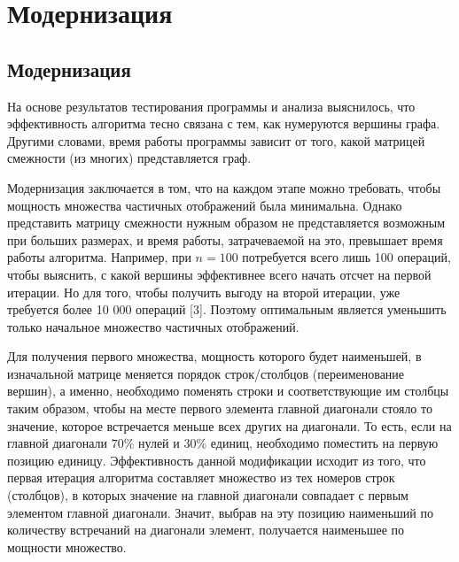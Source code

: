 \section{Модернизация}
\label{sec:AlgoModern_5} 
\large

\subsection{Модернизация}
На основе результатов тестирования программы и анализа выяснилось, что эффективность алгоритма тесно связана с тем, как нумеруются вершины графа. Другими словами, время работы программы зависит от того, какой матрицей смежности (из многих) представляется граф.

Модернизация заключается в том, что на каждом этапе можно требовать, чтобы мощность множества частичных отображений была минимальна. Однако представить матрицу смежности нужным образом не представляется возможным при больших размерах, и время работы, затрачеваемой на это, превышает время работы алгоритма. Например, при $n = 100$ потребуется всего лишь 100 операций, чтобы выяснить, с какой вершины эффективнее всего начать отсчет на первой итерации. Но для того, чтобы получить выгоду на второй итерации, уже требуется более 10 000 операций [3]. Поэтому оптимальным является уменьшить только начальное множество частичных отображений.

Для получения первого множества, мощность которого будет наименьшей, в
изначальной матрице меняется порядок строк/столбцов (переименование вершин), а
именно, необходимо поменять строки и соответствующие им столбцы таким образом,
чтобы на месте первого элемента главной диагонали стояло то значение, которое встречается меньше всех других на диагонали. То есть, если на главной диагонали $70\%$ нулей и $30\%$ единиц,
необходимо поместить на первую позицию единицу. Эффективность данной модификации
исходит из того, что первая итерация алгоритма составляет множество из тех номеров
строк (столбцов), в которых значение на главной диагонали совпадает с первым
элементом главной диагонали. Значит, выбрав на эту позицию наименьший по количеству встречаний на диагонали
элемент, получается наименьшее по мощности множество.

